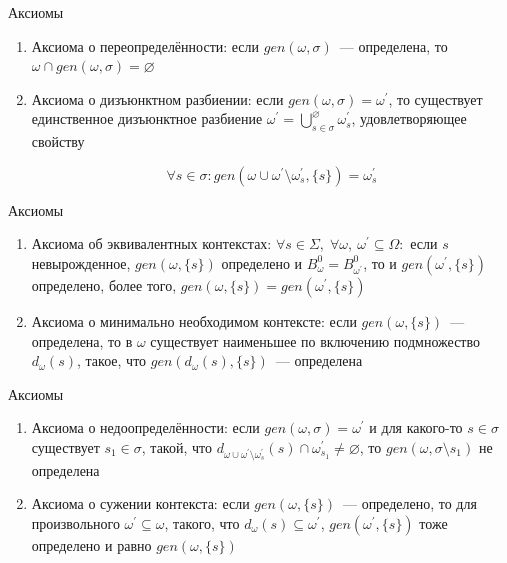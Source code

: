\begin{frame}{Аксиомы}
\begin{enumerate}
	\item Аксиома о переопределённости: если $gen(\omega,\sigma)$~--- определена, то $\omega\cap gen(\omega,\sigma) = \varnothing$
	
	\item Аксиома о дизъюнктном разбиении: если $gen(\omega,\sigma) = \omega^\prime$, то существует единственное дизъюнктное разбиение $\omega^\prime=\bigcup^\varnothing_{s\in\sigma}\omega^\prime_s$, 
	удовлетворяющее свойству 

	$$\forall s\in\sigma : gen(\omega\cup\omega^\prime\setminus\omega^\prime_s,\{s\})=\omega^\prime_s$$
\end{enumerate}
\end{frame}

\begin{frame}{Аксиомы}
\begin{enumerate}
	\setcounter{\enumi}{2}
	\item Аксиома об эквивалентных контекстах: $\forall s\in\Sigma,\; \forall\omega,\:\omega^\prime\subseteq\Omega:$ если $s$ невырожденное, $gen(\omega,\{s\})$ определено и $B^0_{\omega} = B^0_{\omega^\prime}$, то и $gen(\omega^\prime,\{s\})$ определено, более того, $gen(\omega,\{s\}) = gen(\omega^\prime,\{s\})$

	\item Аксиома о минимально необходимом контексте: если $gen(\omega,\{s\})$~--- определена, то в $\omega$ существует наименьшее по включению подмножество $d_\omega(s)$, такое, что $gen(d_\omega(s), \{s\})$~--- определена
\end{enumerate}
\end{frame}

\begin{frame}{Аксиомы}
\begin{enumerate}
	\setcounter{\enumi}{4}
	\item Аксиома о недоопределённости: если $gen(\omega, \sigma) = \omega^\prime$ и для какого-то $s\in\sigma$ существует $s_1\in\sigma$, такой, что $d_{\omega\cup\omega^\prime\setminus\omega^\prime_s}(s) \cap \omega^\prime_{s_1}\ne\varnothing$, то $gen(\omega, \sigma\setminus s_1)$ не определена
	
	\item Аксиома о сужении контекста: если $gen(\omega,\{s\})$~--- определено, то для произвольного $\omega^\prime\subseteq\omega$, такого, что $d_\omega(s)\subseteq\omega^\prime$, $gen(\omega^\prime, \{s\})$ тоже определено и равно $gen(\omega,\{s\})$
\end{enumerate}
\end{frame}

